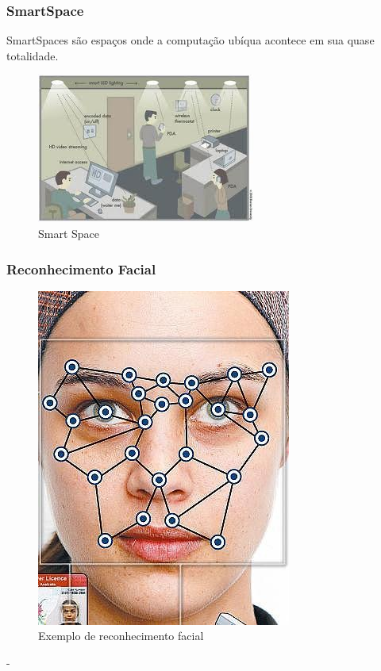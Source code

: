 \documentclass{beamer}
\begin{document}
\begin{frame}
    \frametitle{SmartSpace}

    SmartSpaces são espaços onde a computação ubíqua acontece em sua quase totalidade.
    
    \begin{figure}[h]
    	\centering \includegraphics[scale=0.35]{figuras/smartSpace.jpg}
    	\caption{Smart Space}
    	\label{smart_space} 
    \end{figure}
\end{frame}

\begin{frame}
    \frametitle{Reconhecimento Facial}
    
    \begin{figure}[h]
	\centering \includegraphics[scale=0.4]{figuras/face-recognition.jpg}
    	\caption{Exemplo de reconhecimento facial}
    	\label{reconhecimento_facial}
    \end{figure}-
\end{frame}
\end{document}
